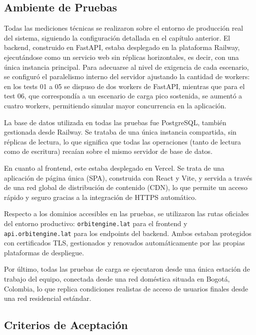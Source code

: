 \subsection{Ambiente de Pruebas}\label{ambiente-de-pruebas}

Todas las mediciones técnicas se realizaron sobre el entorno de producción real del sistema, siguiendo la configuración detallada en el capítulo anterior. El backend, construido en FastAPI, estaba desplegado en la plataforma Railway, ejecutándose como un servicio web sin réplicas horizontales, es decir, con una única instancia principal. Para adecuarse al nivel de exigencia de cada escenario, se configuró el paralelismo interno del servidor ajustando la cantidad de workers: en los tests 01 a 05 se dispuso de dos workers de FastAPI, mientras que para el test 06, que correspondía a un escenario de carga pico sostenida, se aumentó a cuatro workers, permitiendo simular mayor concurrencia en la aplicación.

La base de datos utilizada en todas las pruebas fue PostgreSQL, también gestionada desde Railway. Se trataba de una única instancia compartida, sin réplicas de lectura, lo que significa que todas las operaciones (tanto de lectura como de escritura) recaían sobre el mismo servidor de base de datos.

En cuanto al frontend, este estaba desplegado en Vercel. Se trata de una aplicación de página única (SPA), construida con React y Vite, y servida a través de una red global de distribución de contenido (CDN), lo que permite un acceso rápido y seguro gracias a la integración de HTTPS automático.

Respecto a los dominios accesibles en las pruebas, se utilizaron las rutas oficiales del entorno productivo: \texttt{orbitengine.lat} para el frontend y \texttt{api.orbitengine.lat} para los endpoints del backend. Ambos estaban protegidos con certificados TLS, gestionados y renovados automáticamente por las propias plataformas de despliegue.

Por último, todas las pruebas de carga se ejecutaron desde una única estación de trabajo del equipo, conectada desde una red doméstica situada en Bogotá, Colombia, lo que replica condiciones realistas de acceso de usuarios finales desde una red residencial estándar.

\subsection{Criterios de Aceptación}\label{criterios-de-aceptaciuxf3n}

